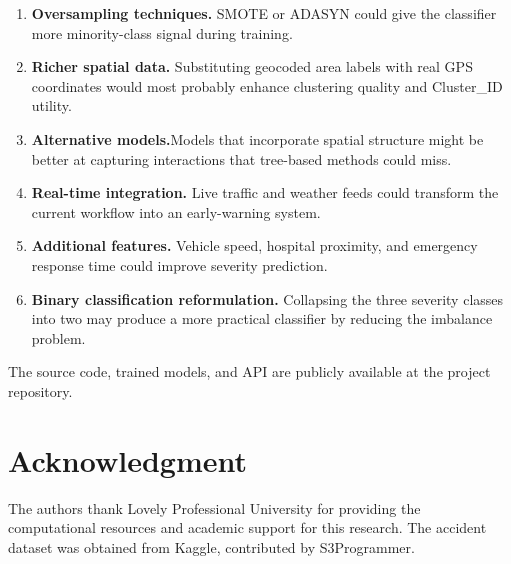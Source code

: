 \documentclass[conference]{IEEEtran}
\begin{document}
\begin{enumerate}
\item \textbf{Oversampling techniques.} SMOTE or ADASYN could give the classifier more minority-class signal during training.

\item \textbf{Richer spatial data.} Substituting geocoded area labels with real GPS coordinates would most probably enhance clustering quality and Cluster\_ID utility.

\item \textbf{Alternative models.}Models that incorporate spatial structure might be better at capturing interactions that tree-based methods could miss.

\item \textbf{Real-time integration.} Live traffic and weather feeds could transform the current workflow into an early-warning system.

\item \textbf{Additional features.} Vehicle speed, hospital proximity, and emergency response time could improve severity prediction.

\item \textbf{Binary classification reformulation.} Collapsing the three severity classes into two may produce a more practical classifier by reducing the imbalance problem.
\end{enumerate}

The source code, trained models, and API are publicly available at the project repository.

\section*{Acknowledgment}

The authors thank Lovely Professional University for providing the computational resources and academic support for this research. The accident dataset was obtained from Kaggle, contributed by S3Programmer.
\end{document}
